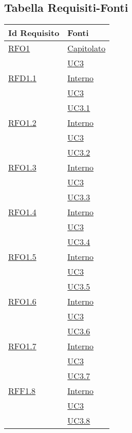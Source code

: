 \newpage
\subsection{Tabella Requisiti-Fonti}
\normalsize
\begin{longtable}{|>{\centering}m{5cm}|m{5cm}<{\centering}|}
\hline 
\textbf{Id Requisito} & \textbf{Fonti}\\
\hline
\endhead
\hyperlink{RFO1}{RFO1} & \hyperlink{Capitolato}{Capitolato}\\
& \hyperref[UC3]{UC3}\\ \hline

\hyperlink{RFD1.1}{RFD1.1} & \hyperlink{Interno}{Interno}\\
& \hyperref[UC3]{UC3}\\
& \hyperref[UC3.1]{UC3.1}\\ \hline

\hyperlink{RFD1.2}{RFO1.2} & \hyperlink{Interno}{Interno}\\
& \hyperref[UC3]{UC3}\\
& \hyperref[UC3.2]{UC3.2}\\ \hline

\hyperlink{RFO1.3}{RFO1.3} & \hyperlink{Interno}{Interno}\\
& \hyperref[UC3]{UC3}\\
& \hyperref[UC3.3]{UC3.3}\\ \hline

\hyperlink{RFO1.4}{RFO1.4} & \hyperlink{Interno}{Interno}\\
& \hyperref[UC3]{UC3}\\
& \hyperref[UC3.4]{UC3.4}\\ \hline

\hyperlink{RFO1.5}{RFO1.5} & \hyperlink{Interno}{Interno}\\
& \hyperref[UC3]{UC3}\\
& \hyperref[UC3.5]{UC3.5}\\ \hline

\hyperlink{RFO1.6}{RFO1.6} & \hyperlink{Interno}{Interno}\\
& \hyperref[UC3]{UC3}\\
& \hyperref[UC3.6]{UC3.6}\\ \hline

\hyperlink{RFO1.7}{RFO1.7} & \hyperlink{Interno}{Interno}\\
& \hyperref[UC3]{UC3}\\
& \hyperref[UC3.7]{UC3.7}\\ \hline

\hyperlink{RFF1.8}{RFF1.8} & \hyperlink{Interno}{Interno}\\
& \hyperref[UC3]{UC3}\\
& \hyperref[UC3.8]{UC3.8}\\ \hline


\end{longtable}
